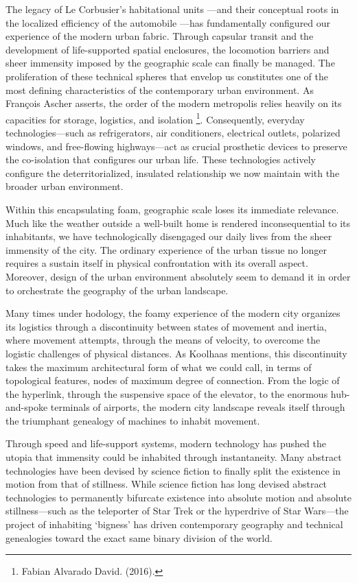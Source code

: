 \documentclass[
  letterpaper,
  DIV=11,
  numbers=noendperiod]{scrreprt}
\begin{document}
The legacy of Le Corbusier's habitational units ---and their conceptual
roots in the localized efficiency of the automobile ---has fundamentally
configured our experience of the modern urban fabric. Through capsular
transit and the development of life-supported spatial enclosures, the
locomotion barriers and sheer immensity imposed by the geographic scale
can finally be managed. The proliferation of these technical spheres
that envelop us constitutes one of the most defining characteristics of
the contemporary urban environment. As François Ascher asserts, the
order of the modern metropolis relies heavily on its capacities for
storage, logistics, and isolation \footnote{Fabian Alvarado David.
  (2016).}. Consequently, everyday technologies---such as refrigerators,
air conditioners, electrical outlets, polarized windows, and
free-flowing highways---act as crucial prosthetic devices to preserve
the co-isolation that configures our urban life. These technologies
actively configure the deterritorialized, insulated relationship we now
maintain with the broader urban environment.

Within this encapsulating foam, geographic scale loses its immediate
relevance. Much like the weather outside a well-built home is rendered
inconsequential to its inhabitants, we have technologically disengaged
our daily lives from the sheer immensity of the city. The ordinary
experience of the urban tissue no longer requires a sustain itself in
physical confrontation with its overall aspect. Moreover, design of the
urban environment absolutely seem to demand it in order to orchestrate
the geography of the urban landscape.

Many times under hodology, the foamy experience of the modern city
organizes its logistics through a discontinuity between states of
movement and inertia, where movement attempts, through the means of
velocity, to overcome the logistic challenges of physical distances. As
Koolhaas mentions, this discontinuity takes the maximum architectural
form of what we could call, in terms of topological features, nodes of
maximum degree of connection. From the logic of the hyperlink, through
the suspensive space of the elevator, to the enormous hub-and-spoke
terminals of airports, the modern city landscape reveals itself through
the triumphant genealogy of machines to inhabit movement.

Through speed and life-support systems, modern technology has pushed the
utopia that immensity could be inhabited through instantaneity. Many
abstract technologies have been devised by science fiction to finally
split the existence in motion from that of stillness. While science
fiction has long devised abstract technologies to permanently bifurcate
existence into absolute motion and absolute stillness---such as the
teleporter of Star Trek or the hyperdrive of Star Wars---the project of
inhabiting `bigness' has driven contemporary geography and technical
genealogies toward the exact same binary division of the world.
\end{document}
